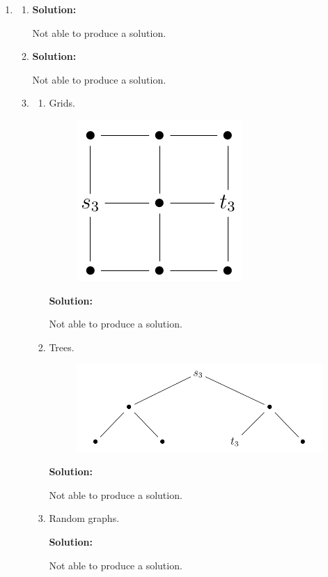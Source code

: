 \documentclass{article}
\begin{document}
\begin{enumerate}
    \item 

    \begin{enumerate}

    \item \textbf{Solution:}\par
        Not able to produce a solution.
    \item \textbf{Solution:}\par
        Not able to produce a solution.
    \item 
        \begin{enumerate}
            \item Grids.        
            \begin{figure}[H]
            \begin{center}
            \includegraphics[scale=0.9]{grid.png} 
            \end{center}
            \end{figure}\par
            \textbf{Solution:}\par
                Not able to produce a solution.
            \item Trees.
            \begin{figure}[H]
            \begin{center}
            \includegraphics[scale=0.6]{tree.png} 
            \end{center}
            \end{figure}\par
            \textbf{Solution:}\par
                Not able to produce a solution.
            \item Random graphs.\par
            \textbf{Solution:}\par
                Not able to produce a solution.
        \end{enumerate}
    \end{enumerate}
\end{enumerate}
\end{document}
